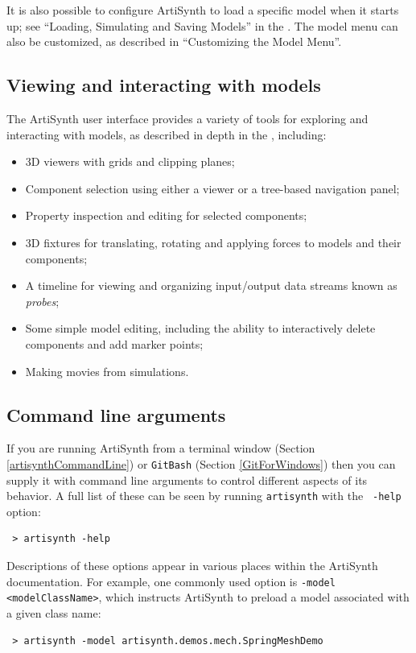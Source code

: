 It is also possible to configure ArtiSynth to load a specific model
when it starts up; see ``Loading, Simulating and Saving Models'' in the
.
The model menu can also be customized, as described in ``Customizing
the Model Menu''.

\subsection{Viewing and interacting with models}

The ArtiSynth user interface provides a variety of tools for exploring
and interacting with models, as described in depth in
the ,
including:

\begin{itemize}

\item 3D viewers with grids and clipping planes;

\item Component selection using either a viewer or
a tree-based navigation panel;

\item Property inspection and editing for selected components;

\item 3D fixtures for translating, rotating and
applying forces to models and their components;

\item A timeline for viewing and organizing input/output data streams
known as {\it probes};

\item Some simple model editing, including the ability to interactively
delete components and add marker points;

\item Making movies from simulations.

\end{itemize}

\subsection{Command line arguments}
\label{CommandLineArguments}

If you are running ArtiSynth from a terminal window
(Section \ref{artisynthCommandLine})
\ifWindows
or {\tt GitBash} (Section \ref{GitForWindows})
\fi
then you can supply it with
command line arguments to control different aspects of its behavior.
A full list of these can be seen by running {\tt artisynth} with the {\tt
-help} option:
\begin{verbatim}
 > artisynth -help
\end{verbatim}
Descriptions of these options appear in various places within the
ArtiSynth documentation. For example, one commonly used option is
{\tt -model <modelClassName>}, which instructs ArtiSynth to preload a
model associated with a given class name:
\begin{verbatim}
 > artisynth -model artisynth.demos.mech.SpringMeshDemo
\end{verbatim}

